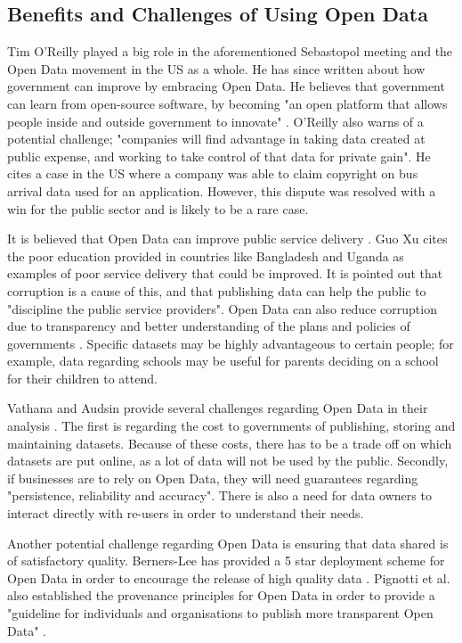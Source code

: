 \documentclass[authoryearcitations]{UoYCSproject}
\begin{document}
\subsection{Benefits and Challenges of Using Open Data}
\label{sec:openDateBenefits&Challenges}

Tim O'Reilly played a big role in the aforementioned Sebastopol meeting and the Open Data movement in the US as a whole. He has since written about how government can improve by embracing Open Data.  He believes that government can learn from open-source software, by becoming "an open platform that allows people inside and outside government to innovate" \citep{OReilly2011}. O'Reilly also warns of a potential challenge; "companies will find advantage in taking data created at public expense, and working to take control of that data for private gain". He cites a case in the US where a company was able to claim copyright on bus arrival data used for an application. However, this dispute was resolved with a win for the public sector and is likely to be a rare case.

It is believed that Open Data can improve public service delivery \citep{Xu2012}. Guo Xu cites the poor education provided in countries like Bangladesh and Uganda as examples of poor service delivery that could be improved. It is pointed out that corruption is a cause of this, and that publishing data can help the public to "discipline the public service providers". Open Data can also reduce corruption due to transparency and better understanding of the plans and policies of governments \citep{Vathana}. Specific datasets may be highly advantageous to certain people; for example, data regarding schools may be useful for parents deciding on a school for their children to attend. 

Vathana and Audsin provide several challenges regarding Open Data in their analysis \citep{Vathana}. The first is regarding the cost to governments of publishing, storing and maintaining datasets. Because of these costs, there has to be a trade off on which datasets are put online, as a lot of data will not be used by the public. Secondly, if businesses are to rely on Open Data, they will need guarantees regarding "persistence, reliability and accuracy". There is also a need for data owners to interact directly with re-users in order to understand their needs.

Another potential challenge regarding Open Data is ensuring that data shared is of satisfactory quality. Berners-Lee has provided a 5 star deployment scheme for Open Data in order to encourage the release of high quality data \citep{Berners-Lee2006}. Pignotti et al. also established the provenance principles for Open Data in order to provide a "guideline for individuals and organisations to publish more transparent Open Data" \citep{Pignotti2011}.
\end{document}
